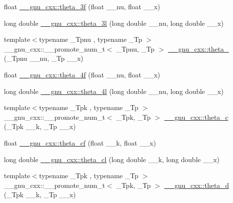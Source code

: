 \begin{DoxyCompactItemize}
\item 
float \hyperlink{group__gnu__math__spec__func_ga9a7c967d2a456f1a6aceee9a53f024b1}{\+\_\+\+\_\+gnu\+\_\+cxx\+::theta\+\_\+3f} (float \+\_\+\+\_\+nu, float \+\_\+\+\_\+x)
\item 
long double \hyperlink{group__gnu__math__spec__func_gaf88874ff6c69940d2191f7947d2ea119}{\+\_\+\+\_\+gnu\+\_\+cxx\+::theta\+\_\+3l} (long double \+\_\+\+\_\+nu, long double \+\_\+\+\_\+x)
\item 
{\footnotesize template$<$typename \+\_\+\+Tpnu , typename \+\_\+\+Tp $>$ }\\\+\_\+\+\_\+gnu\+\_\+cxx\+::\+\_\+\+\_\+promote\+\_\+num\+\_\+t$<$ \+\_\+\+Tpnu, \+\_\+\+Tp $>$ \hyperlink{group__gnu__math__spec__func_ga7b4afc32eb3f1d7c49662cd37af56a20}{\+\_\+\+\_\+gnu\+\_\+cxx\+::theta\+\_} (\+\_\+\+Tpnu \+\_\+\+\_\+nu, \+\_\+\+Tp \+\_\+\+\_\+x)
\item 
float \hyperlink{group__gnu__math__spec__func_ga0c5cbf87e304844ed4c3423be5ca09a5}{\+\_\+\+\_\+gnu\+\_\+cxx\+::theta\+\_\+4f} (float \+\_\+\+\_\+nu, float \+\_\+\+\_\+x)
\item 
long double \hyperlink{group__gnu__math__spec__func_gaaf63a80e90cdcdd66ebb18cd3a84afae}{\+\_\+\+\_\+gnu\+\_\+cxx\+::theta\+\_\+4l} (long double \+\_\+\+\_\+nu, long double \+\_\+\+\_\+x)
\item 
{\footnotesize template$<$typename \+\_\+\+Tpk , typename \+\_\+\+Tp $>$ }\\\+\_\+\+\_\+gnu\+\_\+cxx\+::\+\_\+\+\_\+promote\+\_\+num\+\_\+t$<$ \+\_\+\+Tpk, \+\_\+\+Tp $>$ \hyperlink{group__gnu__math__spec__func_gad2326374205feca04a9996af0a4ebd2a}{\+\_\+\+\_\+gnu\+\_\+cxx\+::theta\+\_\+c} (\+\_\+\+Tpk \+\_\+\+\_\+k, \+\_\+\+Tp \+\_\+\+\_\+x)
\item 
float \hyperlink{group__gnu__math__spec__func_ga409f898afeaad5e25726ad552cfe6946}{\+\_\+\+\_\+gnu\+\_\+cxx\+::theta\+\_\+cf} (float \+\_\+\+\_\+k, float \+\_\+\+\_\+x)
\item 
long double \hyperlink{group__gnu__math__spec__func_ga0531098c628999cf396217ff997cfdda}{\+\_\+\+\_\+gnu\+\_\+cxx\+::theta\+\_\+cl} (long double \+\_\+\+\_\+k, long double \+\_\+\+\_\+x)
\item 
{\footnotesize template$<$typename \+\_\+\+Tpk , typename \+\_\+\+Tp $>$ }\\\+\_\+\+\_\+gnu\+\_\+cxx\+::\+\_\+\+\_\+promote\+\_\+num\+\_\+t$<$ \+\_\+\+Tpk, \+\_\+\+Tp $>$ \hyperlink{group__gnu__math__spec__func_ga030a1ea3efa82f6fbaeac0ed2d6191c2}{\+\_\+\+\_\+gnu\+\_\+cxx\+::theta\+\_\+d} (\+\_\+\+Tpk \+\_\+\+\_\+k, \+\_\+\+Tp \+\_\+\+\_\+x)

\end{DoxyCompactItemize}
